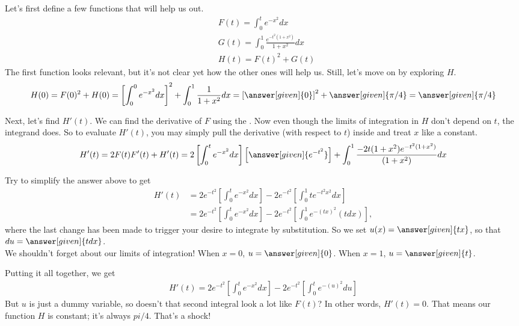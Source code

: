 \documentclass{ximera}
\begin{document}
\begin{exercise}
	Let's first define a few functions that will help us out.
	\begin{align*}
		&F(t)=\int_{0}^{t} e^{-x^2}dx \\
		&G(t)=\int_{0}^{1} \frac{e^{-t^2(1+x^2)}}{1+x^2} dx \\
		&H(t)=F(t)^2+G(t)
	\end{align*}
	The first function looks relevant, but it's not clear yet how the other ones will help us. Still, let's move on by exploring $H$.
	\begin{align*}
	H(0)= F(0)^2+H(0)=\left[\int_{0}^{0} e^{-x^2}dx \right]^2+\int_{0}^{1} \frac{1}{1+x^2} dx = \left[ \answer[given]{0} \right]^2 + \answer[given]{\pi/4} = \answer[given]{\pi/4}
	\end{align*}
	
	Next, let's find $H'(t)$. We can find the derivative of $F$ using the . Now even though the limits of integration in $H$ don't depend on $t$, the integrand does. So to evaluate $H'(t)$, you may simply pull the derivative (with respect to $t$) inside and treat $x$ like a constant.
	\begin{align*}
		H'(t) =2F(t)F'(t)+H'(t) =2 \left[ \int_{0}^{t} e^{-x^2}dx \right] \left[\answer[given]{e^{-t^2}}\right]+\int_{0}^{1} \frac{ -2t(1+x^2) e^{-t^2(1+x^2)}}{(1+x^2)} dx
	\end{align*}
	
	\begin{exercise}
		Try to simplify the answer above to get
		\begin{align*}
			H'(t) &= 2e^{-t^2} \left[ \int_{0}^{t} e^{-x^2}dx \right] -2e^{-t^2} \left[ \int_{0}^{1} t e^{-t^2 x^2} dx \right] \\
			&=2e^{-t^2} \left[ \int_{0}^{t} e^{-x^2}dx \right] -2e^{-t^2} \left[ \int_{0}^{1} e^{-(tx)^2} (tdx) \right],
		\end{align*}
		where the last change has been made to trigger your desire to integrate by substitution. So we set $u(x)=\answer[given]{tx}$, so that $du=\answer[given]{tdx}$. \\
		We shouldn't forget about our limits of integration! When $x=0$, $u=\answer[given]{0}$. When $x=1$, $u=\answer[given]{t}$.
		
		\begin{exercise}
			Putting it all together, we get
			\begin{align*}
				H'(t)=2e^{-t^2} \left[ \int_{0}^{t} e^{-x^2}dx \right] -2e^{-t^2} \left[ \int_{0}^{t} e^{-(u)^2}du \right]
			\end{align*}
			But $u$ is just a dummy variable, so doesn't that second integral look a lot like $F(t)$? In other words, $H'(t)=0$. That means our function $H$ is constant; it's always $pi/4$. That's a shock!
			

\end{exercise}
\end{exercise}
\end{exercise}
\end{document}
